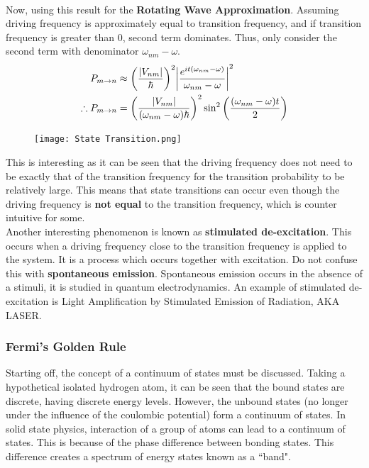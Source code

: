 \documentclass{article}
\begin{document}
\begin{flushleft}
\begin{align*}
\end{align*}
Now, using this result for the \textbf{Rotating Wave Approximation}. Assuming driving frequency is approximately equal to transition frequency, and if transition frequency is greater than 0, second term dominates. Thus, only consider the second term with denominator $\omega_{nm}-\omega$.
\begin{align}
    P_{m\rightarrow n}&\approx\bigg(\frac{\abs{V_{nm}}}{\hbar}\bigg)^2\abs{\frac{e^{it(\omega_{nm}-\omega)}}{\omega_{nm}-\omega}}^2\nonumber\\
    \therefore P_{m\rightarrow n}&=\bigg(\frac{\abs{V_{nm}}}{(\omega_{nm}-\omega)\hbar}\bigg)^2\sin^2\bigg(\frac{(\omega_{nm}-\omega)t}{2}\bigg)
\end{align}

\begin{figure}[ht]
    \centering
    \texttt{[image: State Transition.png]}
\end{figure}
This is interesting as it can be seen that the driving frequency does not need to be exactly that of the transition frequency for the transition probability to be relatively large. This means that state transitions can occur even though the driving frequency is \textbf{not equal} to the transition frequency, which is counter intuitive for some.\\[.5cm]

Another interesting phenomenon is known as \textbf{stimulated de-excitation}. This occurs when a driving frequency close to the transition frequency is applied to the system. It is a process which occurs together with excitation. Do not confuse this with \textbf{spontaneous emission}. Spontaneous emission occurs in the absence of a stimuli, it is studied in quantum electrodynamics. An example of stimulated de-excitation is Light Amplification by Stimulated Emission of Radiation, AKA LASER.\\[.5cm]

\subsubsection{Fermi's Golden Rule}
Starting off, the concept of a continuum of states must be discussed. Taking a hypothetical isolated hydrogen atom, it can be seen that the bound states are discrete, having discrete energy levels. However, the unbound states (no longer under the influence of the coulombic potential) form a continuum of states. In solid state physics, interaction of a group of atoms can lead to a continuum of states. This is because of the phase difference between bonding states. This difference creates a spectrum of energy states known as a ``band".\\[.5cm]


\end{flushleft}
\end{document}
